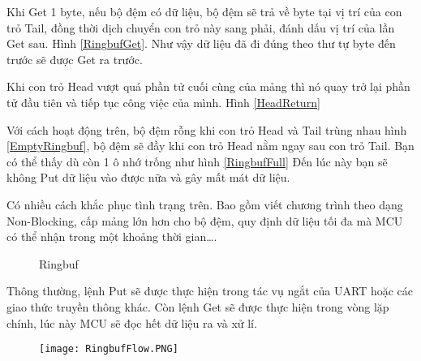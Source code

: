 Khi Get 1 byte, nếu bộ đệm có dữ liệu, bộ đệm sẽ trả về byte tại vị trí của con trỏ Tail, đồng thời dịch chuyển con trỏ này sang phải, đánh dấu vị trí của lần Get sau. Hình \ref{RingbufGet}. Như vậy dữ liệu đã đi đúng theo thư tự byte đến trước sẽ được Get ra trước.

Khi con trỏ Head vượt quá phần tử cuối cùng của mảng thì nó quay trở lại phần tử đầu tiên và tiếp tục công việc của mình. Hình \ref{HeadReturn}

Với cách hoạt động trên, bộ đệm rỗng khi con trỏ Head và Tail trùng nhau hình \ref{EmptyRingbuf}, bộ đệm sẽ đầy khi con trỏ Head nằm ngay sau con trỏ Tail. Bạn có thể thấy dù còn 1 ô nhớ trống như hình \ref{RingbufFull}  Đến lúc này bạn sẽ không Put dữ liệu vào được nữa và gây mất mát dữ liệu.

Có nhiều cách khắc phục tình trạng trên. Bao gồm viết chương trình theo dạng Non-Blocking, cấp mảng lớn hơn cho bộ đệm, quy định dữ liệu tối đa mà MCU có thể nhận trong một khoảng thời gian\dots.

\begin{figure}[h!]
    \centering
    \caption{Ringbuf}
\end{figure}

Thông thường, lệnh Put sẽ được thực hiện trong tác vụ ngắt của UART hoặc các giao thức truyền thông khác. Còn lệnh Get sẽ được thực hiện trong vòng lặp chính, lúc này MCU sẽ đọc hết dữ liệu ra và xử lí.

\begin{figure}[h!]
    \centering
    \texttt{[image: RingbufFlow.PNG]}
\end{figure}


